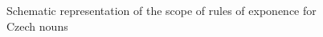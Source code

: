 \documentclass[output=paper]{langsci/langscibook}
\begin{document}
\begin{figure}[p]
%
%
%
%
%
%

\normalfont
\caption{Schematic representation of the scope of rules of exponence for Czech nouns\label{schemabis}}
\end{figure}
\end{document}
